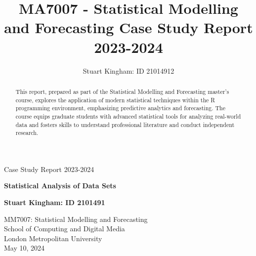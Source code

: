 \documentclass{article}
\title{MA7007 - Statistical Modelling and Forecasting Case Study Report 2023-2024}
\author{Stuart Kingham: ID 21014912}
\begin{document}
\doublespacing



\begin{titlepage}
  \vspace*{\fill}
  \begin{center}
       \vspace*{1cm}

       {\LARGE Case Study Report 2023-2024}

       \vspace*{1cm}
       {\large \textbf{Statistical Analysis of Data Sets}}
       

       \vfill

       \textbf{Stuart Kingham: ID 2101491}

       \vfill
                        
       \vspace{0.8cm}
     

       MM7007: Statistical Modelling and Forecasting\\
       School of Computing and Digital Media\\
       London Metropolitan University\\
       May 10, 2024
            
  \end{center}
  \vspace*{\fill}
\end{titlepage}

\pagebreak

\begin{abstract}
This report, prepared as part of the Statistical Modelling and Forecasting master's course,
explores the application of modern statistical techniques within the R programming environment,
emphasizing predictive analytics and forecasting. The course equips graduate students with
advanced statistical tools for analyzing real-world data
and fosters skills to understand professional literature and conduct independent research.
\end{abstract}
\end{document}
